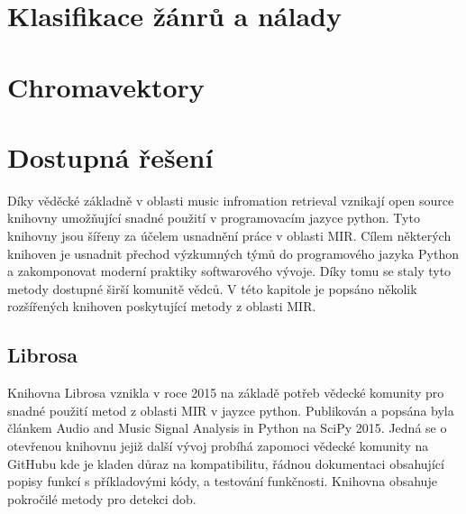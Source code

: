 


\section{Klasifikace žánrů a nálady} \label{sec:Klasifikace_zanru}

\section{Chromavektory} \label{sec:Chroma_vektory}

\section{Dostupná řešení} \label{sec:Dostupna_reseni}
    Díky věděcké základně v oblasti music infromation retrieval vznikají open source knihovny umožňující snadné použití v programovacím jazyce python. Tyto knihovny jsou šířeny za účelem usnadnění práce v oblasti \acs{MIR}. Cílem některých knihoven je usnadnit přechod výzkumných týmů do programového jazyka Python a zakomponovat moderní praktiky softwarového vývoje. Díky tomu se staly tyto metody dostupné širší komunitě vědců.\cite{Librosa} V této kapitole je popsáno několik rozšířených knihoven poskytující metody z oblasti \acs{MIR}.

\subsection{Librosa} \label{Librosa}
    Knihovna Librosa vznikla v roce 2015 na základě potřeb vědecké komunity pro snadné použití metod z oblasti \acs{MIR} v jayzce python.
    Publikován a popsána byla článkem Audio and Music Signal Analysis in Python \cite{Librosa} na SciPy 2015.
    Jedná se o otevřenou knihovnu jejiž další vývoj probíhá zapomoci vědecké komunity na GitHubu kde je kladen důraz na kompatibilitu, řádnou dokumentaci obsahující popisy funkcí s příkladovými kódy, a testování funkčnosti. Knihovna obsahuje pokročilé metody pro detekci dob.

